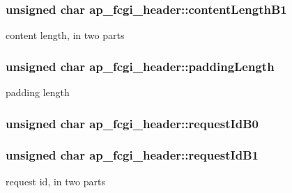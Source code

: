 \subsubsection[{\texorpdfstring{content\+Length\+B1}{contentLengthB1}}]{\setlength{\rightskip}{0pt plus 5cm}unsigned char ap\+\_\+fcgi\+\_\+header\+::content\+Length\+B1}\hypertarget{structap__fcgi__header_a791f3d05f747a02bc01bd3385c717216}{}\label{structap__fcgi__header_a791f3d05f747a02bc01bd3385c717216}
content length, in two parts 
\subsubsection[{\texorpdfstring{padding\+Length}{paddingLength}}]{\setlength{\rightskip}{0pt plus 5cm}unsigned char ap\+\_\+fcgi\+\_\+header\+::padding\+Length}\hypertarget{structap__fcgi__header_a7c6cda148f19984036878241d5d613d2}{}\label{structap__fcgi__header_a7c6cda148f19984036878241d5d613d2}
padding length 
\subsubsection[{\texorpdfstring{request\+Id\+B0}{requestIdB0}}]{\setlength{\rightskip}{0pt plus 5cm}unsigned char ap\+\_\+fcgi\+\_\+header\+::request\+Id\+B0}\hypertarget{structap__fcgi__header_ade42ce07e3d43fc9056a8d8b371564b6}{}\label{structap__fcgi__header_ade42ce07e3d43fc9056a8d8b371564b6}
\subsubsection[{\texorpdfstring{request\+Id\+B1}{requestIdB1}}]{\setlength{\rightskip}{0pt plus 5cm}unsigned char ap\+\_\+fcgi\+\_\+header\+::request\+Id\+B1}\hypertarget{structap__fcgi__header_a731ec669c70b97e67aa9a056622bb35e}{}\label{structap__fcgi__header_a731ec669c70b97e67aa9a056622bb35e}
request id, in two parts 
